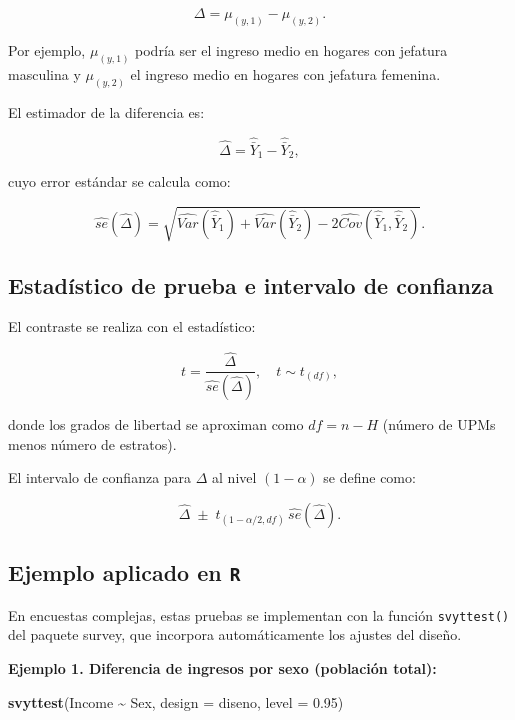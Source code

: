 \documentclass[
  spanish,
  12pt,
]{book}
\newenvironment{Shaded}{\begin{snugshade}}{\end{snugshade}}
\newcommand{\AttributeTok}[1]{\textcolor[rgb]{0.13,0.29,0.53}{#1}}
\newcommand{\FloatTok}[1]{\textcolor[rgb]{0.00,0.00,0.81}{#1}}
\newcommand{\FunctionTok}[1]{\textcolor[rgb]{0.13,0.29,0.53}{\textbf{#1}}}
\newcommand{\NormalTok}[1]{#1}
\newcommand{\SpecialCharTok}[1]{\textcolor[rgb]{0.81,0.36,0.00}{\textbf{#1}}}
\begin{document}
\[
\Delta = \mu_{(y,1)} - \mu_{(y,2)}.
\]

Por ejemplo, \(\mu_{(y,1)}\) podría ser el ingreso medio en hogares con jefatura masculina y \(\mu_{(y,2)}\) el ingreso medio en hogares con jefatura femenina.

El estimador de la diferencia es:

\[
\hat{\Delta} = \hat{\bar{Y}}_1 - \hat{\bar{Y}}_2,
\]

cuyo error estándar se calcula como:

\[
\hat{se}(\hat{\Delta}) = \sqrt{ \hat{Var}(\hat{\bar{Y}}_1) + \hat{Var}(\hat{\bar{Y}}_2) - 2 \hat{Cov}(\hat{\bar{Y}}_1, \hat{\bar{Y}}_2)}.
\]

\subsection{Estadístico de prueba e intervalo de confianza}\label{estaduxedstico-de-prueba-e-intervalo-de-confianza}

El contraste se realiza con el estadístico:

\[
t = \frac{\hat{\Delta}}{\hat{se}(\hat{\Delta})}, \quad t \sim t_{(df)},
\]

donde los grados de libertad se aproximan como \(df = n - H\) (número de UPMs menos número de estratos).

El intervalo de confianza para \(\Delta\) al nivel \((1-\alpha)\) se define como:

\[
\hat{\Delta} \;\pm\; t_{(1-\alpha/2,df)} \, \hat{se}(\hat{\Delta}).
\]

\subsection{\texorpdfstring{Ejemplo aplicado en \texttt{R}}{Ejemplo aplicado en R}}\label{ejemplo-aplicado-en-r}

En encuestas complejas, estas pruebas se implementan con la función \texttt{svyttest()} del paquete survey, que incorpora automáticamente los ajustes del diseño.

\textbf{Ejemplo 1. Diferencia de ingresos por sexo (población total):}

\begin{Shaded}
\begin{Highlighting}[]
\FunctionTok{svyttest}\NormalTok{(Income }\SpecialCharTok{\textasciitilde{}}\NormalTok{ Sex, }\AttributeTok{design =}\NormalTok{ diseno, }\AttributeTok{level =} \FloatTok{0.95}\NormalTok{)}
\end{Highlighting}
\end{Shaded}
\end{document}
